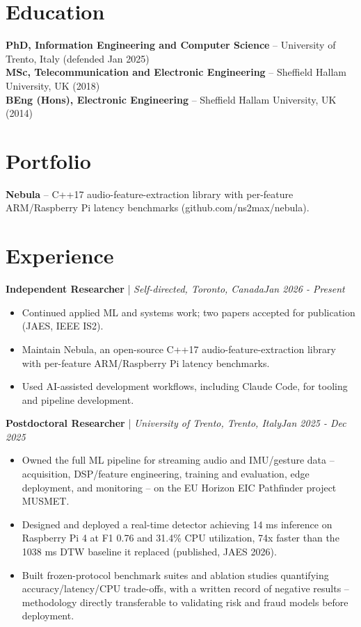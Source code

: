\documentclass[11pt]{article}
\newenvironment{cvrole}[5]{%
  \par\noindent\textbf{\large #1} | \textit{\small #2, #3}\hfill \textit{\small #4 - #5}\par
  \begin{itemize}[leftmargin=2em, itemsep=-0.3em, topsep=-0.5em]%
}{%
  \end{itemize}\par\noindent\mbox{}\par\vspace{0.1em}%
}
\begin{document}
\section*{Education}
\textbf{PhD, Information Engineering and Computer Science} -- University of Trento, Italy (defended Jan 2025)\\
\textbf{MSc, Telecommunication and Electronic Engineering} -- Sheffield Hallam University, UK (2018)\\
\textbf{BEng (Hons), Electronic Engineering} -- Sheffield Hallam University, UK (2014)

\section*{Portfolio}
\textbf{Nebula} -- C++17 audio-feature-extraction library with per-feature ARM/Raspberry Pi latency benchmarks (github.com/ns2max/nebula).

\section*{Experience}

\begin{cvrole}{Independent Researcher}{Self-directed}{Toronto, Canada}{Jan 2026}{Present}
\item Continued applied ML and systems work; two papers accepted for publication (JAES, IEEE IS2).
\item Maintain Nebula, an open-source C++17 audio-feature-extraction library with per-feature ARM/Raspberry Pi latency benchmarks.
\item Used AI-assisted development workflows, including Claude Code, for tooling and pipeline development.
\end{cvrole}

\begin{cvrole}{Postdoctoral Researcher}{University of Trento}{Trento, Italy}{Jan 2025}{Dec 2025}
\item Owned the full ML pipeline for streaming audio and IMU/gesture data -- acquisition, DSP/feature engineering, training and evaluation, edge deployment, and monitoring -- on the EU Horizon EIC Pathfinder project MUSMET.
\item Designed and deployed a real-time detector achieving 14 ms inference on Raspberry Pi 4 at F1 0.76 and 31.4\% CPU utilization, 74x faster than the 1038 ms DTW baseline it replaced (published, JAES 2026).
\item Built frozen-protocol benchmark suites and ablation studies quantifying accuracy/latency/CPU trade-offs, with a written record of negative results -- methodology directly transferable to validating risk and fraud models before deployment.
\end{cvrole}
\end{document}
